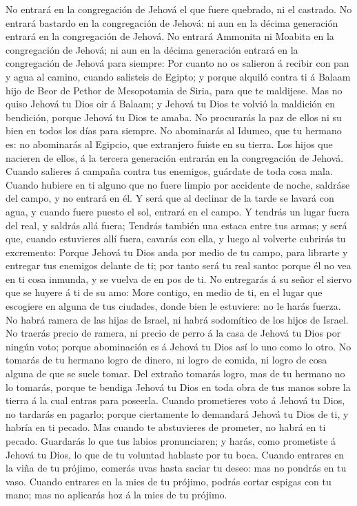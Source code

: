  No entrará en la congregación de Jehová el que fuere
quebrado, ni el castrado.  No entrará bastardo en la
congregación de Jehová: ni aun en la décima generación entrará en la
congregación de Jehová.  No entrará Ammonita ni Moabita en
la congregación de Jehová; ni aun en la décima generación entrará en la
congregación de Jehová para siempre:  Por cuanto no os
salieron á recibir con pan y agua al camino, cuando salisteis de Egipto;
y porque alquiló contra ti á Balaam hijo de Beor de Pethor de
Mesopotamia de Siria, para que te maldijese.  Mas no quiso
Jehová tu Dios oir á Balaam; y Jehová tu Dios te volvió la maldición en
bendición, porque Jehová tu Dios te amaba.  No procurarás la
paz de ellos ni su bien en todos los días para siempre.  No
abominarás al Idumeo, que tu hermano es: no abominarás al Egipcio, que
extranjero fuiste en su tierra.  Los hijos que nacieren de
ellos, á la tercera generación entrarán en la congregación de Jehová.
 Cuando salieres á campaña contra tus enemigos, guárdate de
toda cosa mala.  Cuando hubiere en ti alguno que no fuere
limpio por accidente de noche, saldráse del campo, y no entrará en él.
 Y será que al declinar de la tarde se lavará con agua, y
cuando fuere puesto el sol, entrará en el campo.  Y tendrás
un lugar fuera del real, y saldrás allá fuera;  Tendrás
también una estaca entre tus armas; y será que, cuando estuvieres allí
fuera, cavarás con ella, y luego al volverte cubrirás tu excremento:
 Porque Jehová tu Dios anda por medio de tu campo, para
librarte y entregar tus enemigos delante de ti; por tanto será tu real
santo: porque él no vea en ti cosa inmunda, y se vuelva de en pos de ti.
 No entregarás á su señor el siervo que se huyere á ti de
su amo:  More contigo, en medio de ti, en el lugar que
escogiere en alguna de tus ciudades, donde bien le estuviere: no le
harás fuerza.  No habrá ramera de las hijas de Israel, ni
habrá sodomítico de los hijos de Israel.  No traerás precio
de ramera, ni precio de perro á la casa de Jehová tu Dios por ningún
voto; porque abominación es á Jehová tu Dios así lo uno como lo otro.
 No tomarás de tu hermano logro de dinero, ni logro de
comida, ni logro de cosa alguna de que se suele tomar.  Del
extraño tomarás logro, mas de tu hermano no lo tomarás, porque te
bendiga Jehová tu Dios en toda obra de tus manos sobre la tierra á la
cual entras para poseerla.  Cuando prometieres voto á
Jehová tu Dios, no tardarás en pagarlo; porque ciertamente lo demandará
Jehová tu Dios de ti, y habría en ti pecado.  Mas cuando te
abstuvieres de prometer, no habrá en ti pecado.  Guardarás
lo que tus labios pronunciaren; y harás, como prometiste á Jehová tu
Dios, lo que de tu voluntad hablaste por tu boca.  Cuando
entrares en la viña de tu prójimo, comerás uvas hasta saciar tu deseo:
mas no pondrás en tu vaso.  Cuando entrares en la mies de
tu prójimo, podrás cortar espigas con tu mano; mas no aplicarás hoz á la
mies de tu prójimo.

